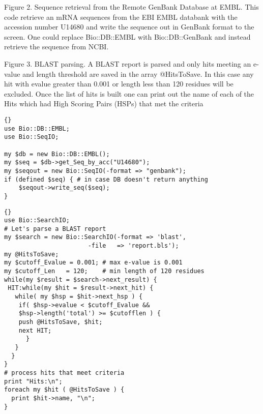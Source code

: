 \documentclass[12pt]{article}
\begin{document}
Figure 2. Sequence retrieval from the Remote GenBank Database at EMBL.
This code retrieve an mRNA sequences from the EBI EMBL databank with
the accession number U14680 and write the sequence out in GenBank
format to the screen.  One could replace Bio::DB::EMBL with
Bio::DB::GenBank and instead retrieve the sequence from NCBI.

\newpage


Figure 3. BLAST parsing. A BLAST report is parsed and only hits meeting
an e-value and length threshold are saved in the array @HitsToSave.  
In this case any hit with evalue greater than 0.001 or length less 
than 120 residues will be excluded.  Once the list of hits is built 
one can print out the name of each of the Hits which had High Scoring
Pairs (HSPs) that met the criteria

\newpage


\centerline{}

\newpage

\singlespacing



\begin{scriptsize}
\begin{lstlisting}{}
use Bio::DB::EMBL;
use Bio::SeqIO;

my $db = new Bio::DB::EMBL();
my $seq = $db->get_Seq_by_acc("U14680");
my $seqout = new Bio::SeqIO(-format => "genbank");
if (defined $seq) { # in case DB doesn't return anything
    $seqout->write_seq($seq);
}
\end{lstlisting}
\end{scriptsize}


\newpage


\begin{scriptsize}
\begin{lstlisting}{}
use Bio::SearchIO;
# Let's parse a BLAST report 
my $search = new Bio::SearchIO(-format => 'blast',
          		       -file   => 'report.bls');
my @HitsToSave;
my $cutoff_Evalue = 0.001; # max e-value is 0.001
my $cutoff_Len   = 120;    # min length of 120 residues
while(my $result = $search->next_result) {
 HIT:while(my $hit = $result->next_hit) {
   while( my $hsp = $hit->next_hsp ) {
    if( $hsp->evalue < $cutoff_Evalue && 
	$hsp->length('total') >= $cutofflen ) { 
	push @HitsToSave, $hit;
	next HIT;
      } 
   }
  }
}
# process hits that meet criteria
print "Hits:\n";
foreach my $hit ( @HitsToSave ) {
  print $hit->name, "\n";	
}

\end{lstlisting}
\end{scriptsize}
\end{document}
